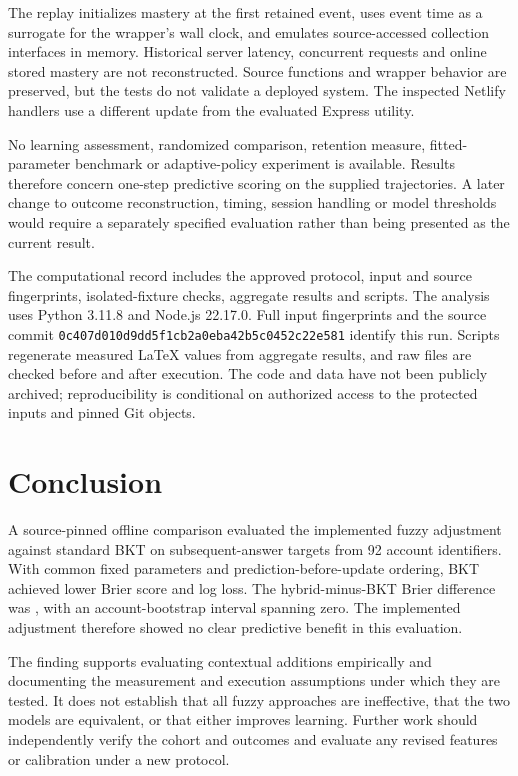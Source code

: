 \documentclass[conference]{IEEEtran}
\begin{document}
The replay initializes mastery at the first retained event, uses event time as a surrogate for the wrapper's wall clock, and emulates source-accessed collection interfaces in memory. Historical server latency, concurrent requests and online stored mastery are not reconstructed. Source functions and wrapper behavior are preserved, but the tests do not validate a deployed system. The inspected Netlify handlers use a different update from the evaluated Express utility.

No learning assessment, randomized comparison, retention measure, fitted-parameter benchmark or adaptive-policy experiment is available. Results therefore concern one-step predictive scoring on the supplied trajectories. A later change to outcome reconstruction, timing, session handling or model thresholds would require a separately specified evaluation rather than being presented as the current result.

The computational record includes the approved protocol, input and source fingerprints, isolated-fixture checks, aggregate results and scripts. The analysis uses Python 3.11.8 and Node.js 22.17.0. Full input fingerprints and the source commit \texttt{0c407d010d9dd5f1cb2a0eba42b5c0452c22e581} identify this run. Scripts regenerate measured LaTeX values from aggregate results, and raw files are checked before and after execution. The code and data have not been publicly archived; reproducibility is conditional on authorized access to the protected inputs and pinned Git objects.

\section{Conclusion}
A source-pinned offline comparison evaluated the implemented fuzzy adjustment against standard BKT on \ScoredTargets{} subsequent-answer targets from 92 account identifiers. With common fixed parameters and prediction-before-update ordering, BKT achieved lower Brier score and log loss. The hybrid-minus-BKT Brier difference was \BrierDelta{}, with an account-bootstrap interval spanning zero. The implemented adjustment therefore showed no clear predictive benefit in this evaluation.

The finding supports evaluating contextual additions empirically and documenting the measurement and execution assumptions under which they are tested. It does not establish that all fuzzy approaches are ineffective, that the two models are equivalent, or that either improves learning. Further work should independently verify the cohort and outcomes and evaluate any revised features or calibration under a new protocol.
\end{document}
